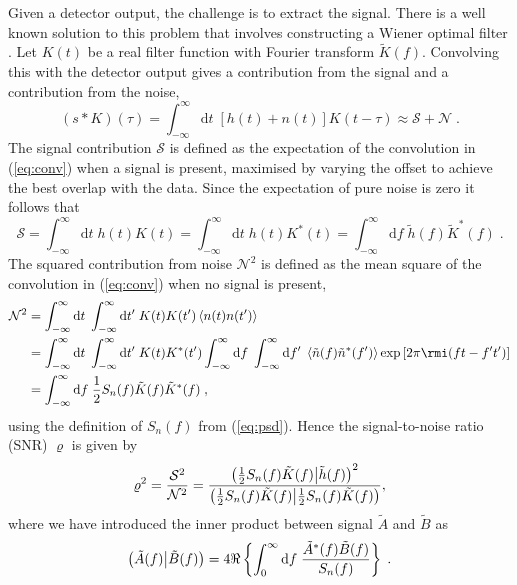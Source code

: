 Given a detector output, the challenge is to extract the signal. There is a well known solution to this problem that involves constructing a Wiener optimal filter \citep{Wiener49}. Let $K(t)$ be a real filter function with Fourier transform $\tilde{K}(f)$. Convolving this with the detector output gives a contribution from the signal and a contribution from the noise,
\begin{equation}\label{eq:conv}
\left(s*K\right)(\tau) = \int_{-\infty}^{\infty}\mathrm{d}t\;\left[h(t)+n(t)\right]K(t-\tau) \approx \mathcal{S} + \mathcal{N} \; .
\end{equation}
The signal contribution $\mathcal{S}$ is defined as the expectation of the convolution in (\ref{eq:conv}) when a signal is present, maximised by varying the offset to achieve the best overlap with the data. Since the expectation of pure noise is zero it follows that
\begin{equation}
\mathcal{S} = \int_{-\infty}^{\infty}\mathrm{d}t\;h(t)K(t)=\int_{-\infty}^{\infty}\mathrm{d}t\;h(t)K^{*}(t)=\int_{-\infty}^{\infty}\mathrm{d}f\; \tilde{h}(f)\tilde{K}^{*}(f) \; .
\end{equation}
The squared contribution from noise $\mathcal{N}^{2}$ is defined as the mean square of the convolution in (\ref{eq:conv}) when no signal is present,
\begin{eqnarray} 
\mathcal{N}^{2} &= \int_{-\infty}^{\infty}\mathrm{d}t\;\int_{-\infty}^{\infty}\mathrm{d}t'\;K(t)K(t')\left<n(t)n(t')\right> \nonumber \\
 &= \int_{-\infty}^{\infty}\mathrm{d}t\;\int_{-\infty}^{\infty}\mathrm{d}t'\;K(t)K^{*}(t')\int_{-\infty}^{\infty}\mathrm{d}f\;\int_{-\infty}^{\infty}\mathrm{d}f'\;\left<\tilde{n}(f)\tilde{n}^{*}(f')\right>\exp\left[2\pi\rmi(ft-f't')\right]\nonumber \\
 &= \int_{-\infty}^{\infty}\mathrm{d}f \; \frac{1}{2}S_{n}(f)\tilde{K}(f)\tilde{K}^{*}(f) \; ,
 \end{eqnarray}
using the definition of $S_{n}(f)$ from (\ref{eq:psd}). Hence the signal-to-noise ratio (SNR) $\varrho$ is given by
\begin{equation}\label{eq:SNRinnerprod} 
\varrho^{2} = \frac{\mathcal{S}^{2}}{\mathcal{N}^{2}}= \frac{\left({\frac{1}{2}S_{n}(f)\tilde{K}(f)}\middle|{\tilde{h}(f)}\right)^{2}}{\left({\frac{1}{2}S_{n}(f)\tilde{K}(f)}\middle|{\frac{1}{2}S_{n}(f)\tilde{K}(f)}\right)},
\end{equation}
where we have introduced the inner product between signal $\tilde{A}$ and $\tilde{B}$ as \citep{Finn1992}
\begin{equation}\label{eq:snrinnerprod} \left({\tilde{A}(f)}\middle|{\tilde{B}(f)}\right) = 4\Re\left\{\int_{0}^{\infty}\mathrm{d}f\;\frac{\tilde{A}^{*}(f)\tilde{B}(f)}{S_{n}(f)}\right\} \; .\end{equation}

